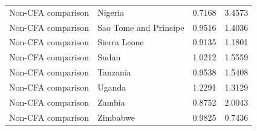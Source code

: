 \begin{table}
\begin{tabular}[t]{llrr}
Non-CFA comparison & Nigeria & 0.7168 & 3.4573\\
Non-CFA comparison & Sao Tome and Principe & 0.9516 & 1.4036\\
Non-CFA comparison & Sierra Leone & 0.9135 & 1.1801\\
\addlinespace
Non-CFA comparison & Sudan & 1.0212 & 1.5559\\
Non-CFA comparison & Tanzania & 0.9538 & 1.5408\\
Non-CFA comparison & Uganda & 1.2291 & 1.3129\\
Non-CFA comparison & Zambia & 0.8752 & 2.0043\\
Non-CFA comparison & Zimbabwe & 0.9825 & 0.7436\\
\bottomrule
\end{tabular}
\end{table}